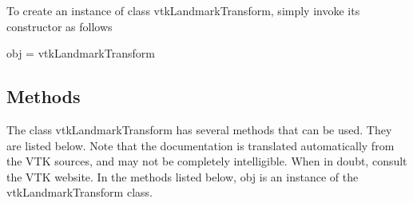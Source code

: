 To create an instance of class vtk\-Landmark\-Transform, simply invoke its constructor as follows \begin{DoxyVerb}  obj = vtkLandmarkTransform
\end{DoxyVerb}
 \hypertarget{vtkwidgets_vtkxyplotwidget_Methods}{}\subsection{Methods}\label{vtkwidgets_vtkxyplotwidget_Methods}
The class vtk\-Landmark\-Transform has several methods that can be used. They are listed below. Note that the documentation is translated automatically from the V\-T\-K sources, and may not be completely intelligible. When in doubt, consult the V\-T\-K website. In the methods listed below, {\ttfamily obj} is an instance of the vtk\-Landmark\-Transform class. 
